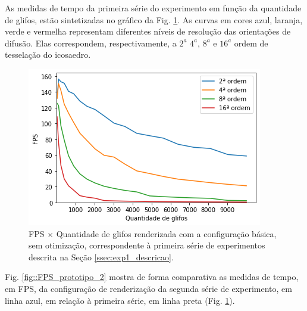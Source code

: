 As medidas de tempo da primeira série do experimento em função da quantidade de glifos, estão sintetizadas no gráfico da Fig. \ref{fig::FPS_prototipo_1}. As curvas em cores azul, laranja, verde e vermelha representam diferentes níveis de resolução das orientações de difusão. Elas correspondem, respectivamente, a $2^{a}$ $4^{a}$, $8^{a}$ e $16^{a}$ ordem de tesselação do icosaedro.



\begin{figure}[ht]
    \centering
    \includegraphics[width=.65\linewidth, angle=0]{figs/Renderizacao_glifos_evolucao/FPS_prototipo1_Geral_legendado.png}
    \caption{FPS $\times$ Quantidade de glifos renderizada com a configuração básica, sem otimização, correspondente à primeira série de experimentos descrita na Seção \ref{ssec:exp1_descricao}.}
    \label{fig::FPS_prototipo_1}
\end{figure}

Fig. \ref{fig::FPS_prototipo_2} mostra de forma comparativa as medidas de tempo, em FPS, da configuração de renderização da segunda série de experimento, em linha azul, em relação à primeira série, em linha preta (Fig. \ref{fig::FPS_prototipo_1}).

